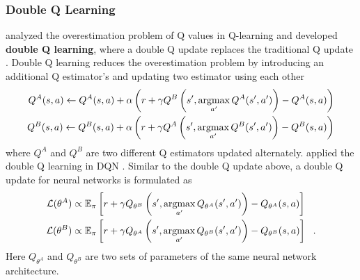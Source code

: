 \subsubsection{Double Q Learning}
\citeauthor{DoubleQlearning_Hasselt_2010} analyzed the overestimation problem of Q values in Q-learning and developed \textbf{double Q learning}, where a double Q update replaces the traditional Q update \cite{DoubleQlearning_Hasselt_2010}.
Double Q learning reduces the overestimation problem by introducing an additional Q estimator's and updating two estimator using each other
\begin{align*}
    Q^{A}(s, a) \leftarrow Q^{A}(s, a)+ \alpha \left(r+\gamma Q^{B}\left(s', \operatorname*{argmax}_{a'}{Q^A(s', a')}\right)-Q^{A}(s, a)\right)  \\
    Q^{B}(s, a) \leftarrow Q^{B}(s, a)+ \alpha \left(r+\gamma Q^{A}\left(s', \operatorname*{argmax}_{a'}{Q^B(s', a')}\right)-Q^{B}(s, a)\right)
\end{align*}
where $Q^A$ and $Q^B$ are two different Q estimators updated alternately.
\citeauthor{DeepReinforcementLearning_Hasselt.Guez.ea_2016} applied the double Q learning in DQN \cite{DeepReinforcementLearning_Hasselt.Guez.ea_2016}.
Similar to the double Q update above, a double Q update for neural networks is formulated as
\begin{align*}
    \mathcal{L}(\theta^A)  & \propto \mathbb{E}_\pi \left[ r + \gamma Q_{\theta^B}\left(s', \operatorname*{argmax}_{a'}{Q_{\theta^A}(s', a')} \right) - Q_{\theta^A}(s, a) \right]  \\
    \mathcal{L}(\theta^B)  & \propto \mathbb{E}_\pi \left[ r + \gamma Q_{\theta^A}\left(s', \operatorname*{argmax}_{a'}{Q_{\theta^B}(s', a')} \right) - Q_{\theta^B}(s, a) \right] ~~ .
\end{align*}
Here $Q_{\theta^A}$ and $Q_{\theta^B}$ are two sets of parameters of the same neural network architecture.

